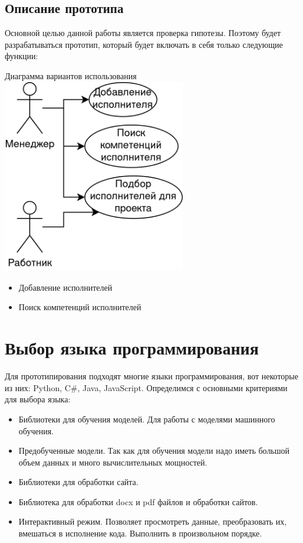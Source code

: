 \documentclass[PI,KR]{HSEUniversity}
\begin{document}
\subsection{Описание прототипа}
Основной целью данной работы является проверка гипотезы. Поэтому будет разрабатываться прототип, который будет включать в себя только следующие функции:
\begin{FIGURE}[h]{Диаграмма вариантов использования \label{fig:figure3}}
	\includegraphics[width=0.6\textwidth]{img/Диаграмма вариантов использования прототипа}
\end{FIGURE}
\begin{itemize}
	\item Добавление исполнителей
	\item Поиск компетенций исполнителей
\end{itemize}
\section{Выбор языка программирования}
Для прототипирования подходят многие языки программирования, вот некоторые из них: Python, C\#, Java, JavaScript. Определимся с основными критериями для выбора языка:

\begin{itemize}
	\item Библиотеки для обучения моделей. Для работы с моделями машинного обучения.
	\item Предобученные модели. Так как для обучения модели надо иметь большой объем данных и много вычислительных мощностей.
	\item Библиотеки для обработки сайта.
	\item Библиотека для обработки docx и pdf файлов и обработки сайтов.
	\item Интерактивный режим. Позволяет просмотреть данные, преобразовать их, вмешаться в исполнение кода. Выполнить в произвольном порядке.
\end{itemize} 
\end{document}
